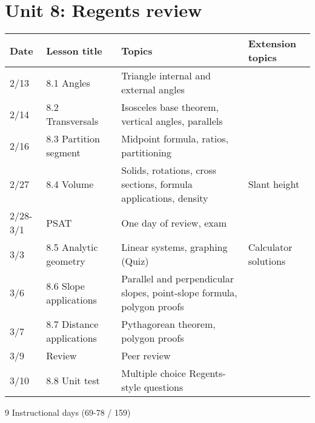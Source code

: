 \documentclass[12pt, twoside]{article}
\begin{document}
\section*{Unit 8: Regents review}
\begin{tabular}{|p{0.9cm}|p{4cm}|p{7cm}|p{5cm}|}
  \hline
  Date & Lesson title & Topics  & Extension topics \\
  \hline
  2/13 & 8.1 Angles & Triangle internal and external angles &  \\
  \hline
  2/14 & 8.2 Transversals & Isosceles base theorem, vertical angles, parallels &  \\
  \hline
  2/16 & 8.3 Partition segment & Midpoint formula, ratios, partitioning &  \\
  \hline
  2/27 & 8.4 Volume & Solids, rotations, cross sections, formula applications, density & Slant height \\
  \hline
  2/28-3/1 & PSAT & One day of review, exam &  \\
  \hline
  3/3 & 8.5 Analytic geometry & Linear systems, graphing (Quiz) & Calculator solutions \\
  \hline
  3/6 & 8.6 Slope applications & Parallel and perpendicular slopes, point-slope formula, polygon proofs &  \\
  \hline
  3/7 & 8.7 Distance applications & Pythagorean theorem, polygon proofs &  \\
  \hline
  3/9 & Review & Peer review & \\
  \hline
  3/10 & 8.8 Unit test & Multiple choice Regents-style questions & \\
  \hline

\end{tabular} \par \vspace*{0.3cm}
9 Instructional days (69-78 / 159)

\newpage
\end{document}
